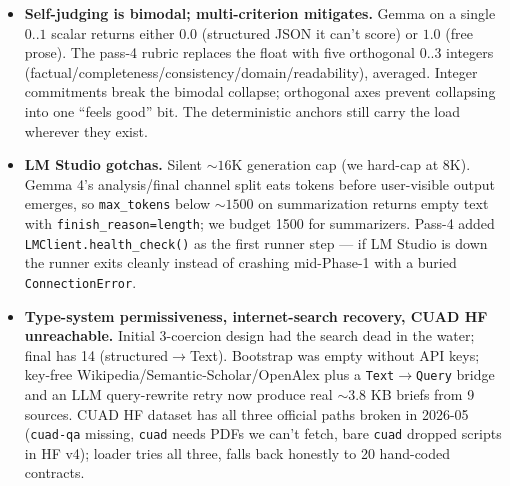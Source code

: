 \documentclass[11pt,a4paper]{article}
\begin{document}
\begin{itemize}[leftmargin=1.2em]
\item \textbf{Self-judging is bimodal; multi-criterion mitigates.} Gemma on a single $0..1$ scalar returns either $0.0$ (structured JSON it can't score) or $1.0$ (free prose). The pass-4 rubric replaces the float with five orthogonal $0..3$ integers (factual/completeness/consistency/domain/readability), averaged. Integer commitments break the bimodal collapse; orthogonal axes prevent collapsing into one ``feels good'' bit. The deterministic anchors still carry the load wherever they exist.

\item \textbf{LM Studio gotchas.} Silent ${\sim}16$K generation cap (we hard-cap at 8K). Gemma 4's analysis/final channel split eats tokens before user-visible output emerges, so \texttt{max\_tokens} below ${\sim}1500$ on summarization returns empty text with \texttt{finish\_reason=length}; we budget 1500 for summarizers. Pass-4 added \texttt{LMClient.health\_check()} as the first runner step --- if LM Studio is down the runner exits cleanly instead of crashing mid-Phase-1 with a buried \texttt{ConnectionError}.

\item \textbf{Type-system permissiveness, internet-search recovery, CUAD HF unreachable.} Initial 3-coercion design had the search dead in the water; final has 14 (structured$\to$Text). Bootstrap was empty without API keys; key-free Wikipedia/Semantic-Scholar/OpenAlex plus a \texttt{Text}$\to$\texttt{Query} bridge and an LLM query-rewrite retry now produce real $\sim$3.8 KB briefs from 9 sources. CUAD HF dataset has all three official paths broken in 2026-05 (\texttt{cuad-qa} missing, \texttt{cuad} needs PDFs we can't fetch, bare \texttt{cuad} dropped scripts in HF v4); loader tries all three, falls back honestly to 20 hand-coded contracts.
\end{itemize}
\end{document}
